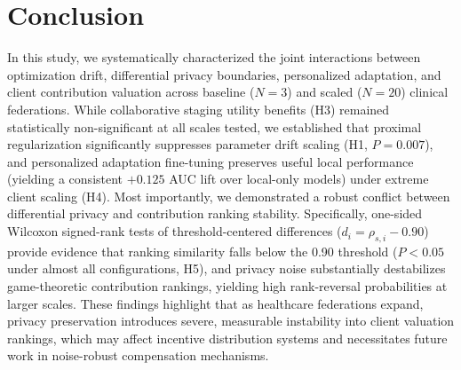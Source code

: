 \documentclass[conference]{IEEEtran}
\begin{document}
\section{Conclusion}
In this study, we systematically characterized the joint interactions between optimization drift, differential privacy boundaries, personalized adaptation, and client contribution valuation across baseline ($N=3$) and scaled ($N=20$) clinical federations. While collaborative staging utility benefits (H3) remained statistically non-significant at all scales tested, we established that proximal regularization significantly suppresses parameter drift scaling (H1, $P=0.007$), and personalized adaptation fine-tuning preserves useful local performance (yielding a consistent $+0.125$ AUC lift over local-only models) under extreme client scaling (H4). Most importantly, we demonstrated a robust conflict between differential privacy and contribution ranking stability. Specifically, one-sided Wilcoxon signed-rank tests of threshold-centered differences ($d_i = \rho_{s,i} - 0.90$) provide evidence that ranking similarity falls below the 0.90 threshold ($P < 0.05$ under almost all configurations, H5), and privacy noise substantially destabilizes game-theoretic contribution rankings, yielding high rank-reversal probabilities at larger scales. These findings highlight that as healthcare federations expand, privacy preservation introduces severe, measurable instability into client valuation rankings, which may affect incentive distribution systems and necessitates future work in noise-robust compensation mechanisms.



\end{document}
